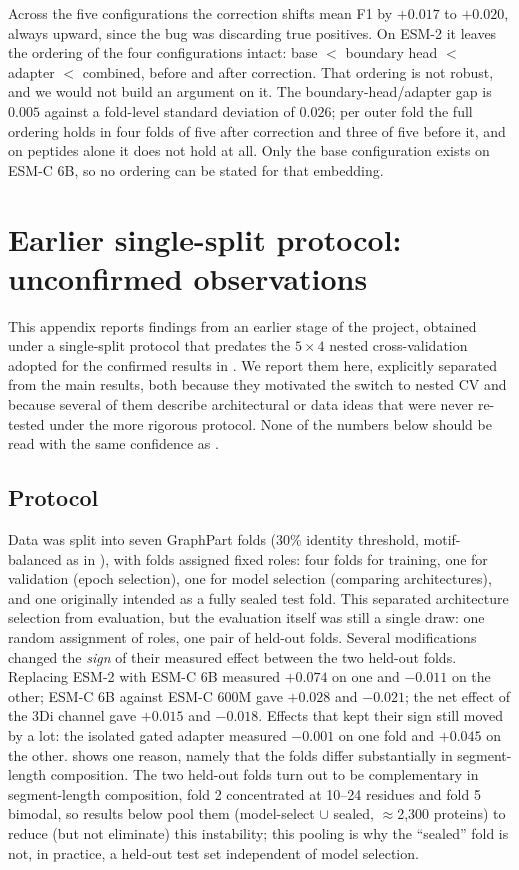 \documentclass{article}
\begin{document}
Across the five configurations the correction shifts mean F1 by $+0.017$ to $+0.020$, always upward, since the bug was discarding true positives. On ESM-2 it leaves the ordering of the four configurations intact: base $<$ boundary head $<$ adapter $<$ combined, before and after correction. That ordering is not robust, and we would not build an argument on it. The boundary-head/adapter gap is $0.005$ against a fold-level standard deviation of $0.026$; per outer fold the full ordering holds in four folds of five after correction and three of five before it, and on peptides alone it does not hold at all. Only the base configuration exists on ESM-C 6B, so no ordering can be stated for that embedding.
\section{Earlier single-split protocol: unconfirmed observations}
\label{sec:app-old-protocol}

This appendix reports findings from an earlier stage of the project, obtained under a single-split protocol that predates the $5\times4$ nested cross-validation adopted for the confirmed results in . We report them here, explicitly separated from the main results, both because they motivated the switch to nested CV and because several of them describe architectural or data ideas that were never re-tested under the more rigorous protocol. None of the numbers below should be read with the same confidence as .

\subsection{Protocol}

Data was split into seven GraphPart folds (30\% identity threshold, motif-balanced as in ), with folds assigned fixed roles: four folds for training, one for validation (epoch selection), one for model selection (comparing architectures), and one originally intended as a fully sealed test fold. This separated architecture selection from evaluation, but the evaluation itself was still a single draw: one random assignment of roles, one pair of held-out folds. Several modifications changed the \emph{sign} of their measured effect between the two held-out folds. Replacing ESM-2 with ESM-C 6B measured $+0.074$ on one and $-0.011$ on the other; ESM-C 6B against ESM-C 600M gave $+0.028$ and $-0.021$; the net effect of the 3Di channel gave $+0.015$ and $-0.018$. Effects that kept their sign still moved by a lot: the isolated gated adapter measured $-0.001$ on one fold and $+0.045$ on the other.  shows one reason, namely that the folds differ substantially in segment-length composition. The two held-out folds turn out to be complementary in segment-length composition, fold 2 concentrated at 10--24 residues and fold 5 bimodal, so results below pool them (model-select $\cup$ sealed, $\approx$2{,}300 proteins) to reduce (but not eliminate) this instability; this pooling is why the ``sealed'' fold is not, in practice, a held-out test set independent of model selection.
\end{document}

